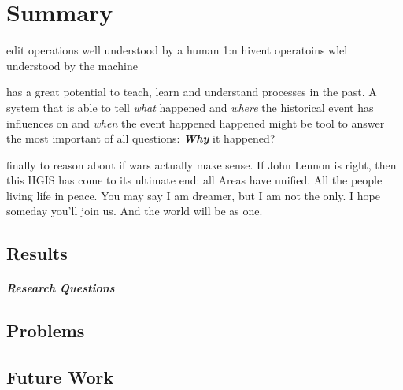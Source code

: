 
\chapter{Summary} %
\label{cha:summary}

edit operations well understood by a human
1:n
hivent operatoins wlel understood by the machine


has a great potential to teach, learn and understand processes in the past. A system that is able to tell \emph{what} happened and \emph{where} the historical event has influences on and \emph{when} the event happened happened might be tool to answer the most important of all questions:
\textbf{\emph{Why}} it happened?


finally to reason about if wars actually make sense.
If John Lennon is right, then this HGIS has come to its ultimate end: all Areas have unified. All the people living life in peace. You may say I am dreamer, but I am not the only. I hope someday you'll join us. And the world will be as one.

\section{Results} %
\label{sec:results}



\paragraph{Research Questions} %
\label{par:result_research_questions}



\section{Problems} %
\label{sec:problems}




\section{Future Work} %
\label{sec:future_work}

